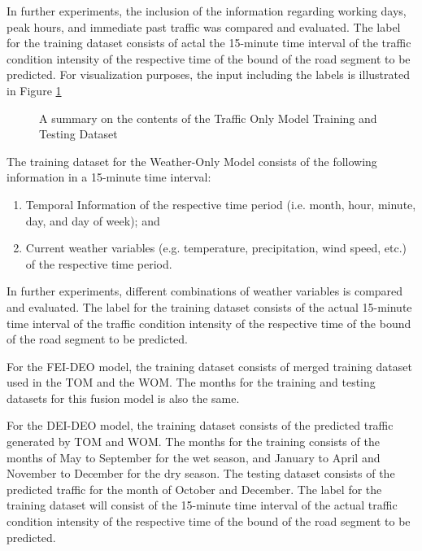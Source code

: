 In further experiments, the inclusion of the information regarding working days, peak hours, and immediate past traffic was compared and evaluated. The label for the training dataset consists of actal the 15-minute time interval of the traffic condition intensity of the respective time of the bound of the road segment to be predicted. For visualization purposes, the input including the labels is illustrated in Figure \ref{fig:TOM_TrainingTestingInput}


\begin{figure}
\centering
\captionsetup{justification=centering}
\caption{A summary on the contents of the Traffic Only Model Training and Testing Dataset}
\label{fig:TOM_TrainingTestingInput}
\end{figure}


The training dataset for the Weather-Only Model consists of the following information in a 15-minute time interval:

\begin{enumerate}
\item Temporal Information of the respective time period (i.e. month, hour, minute, day, and day of week); and
\item Current weather variables (e.g. temperature, precipitation, wind speed, etc.) of the respective time period.
\end{enumerate}

In further experiments, different combinations of weather variables is compared and evaluated. The label for the training dataset consists of the actual 15-minute time interval of the traffic condition intensity of the respective time of the bound of the road segment to be predicted.

For the FEI-DEO model, the training dataset consists of merged training dataset used in the TOM and the WOM. The months for the training and testing datasets for this fusion model is also the same.

For the DEI-DEO model, the training dataset consists of the predicted traffic generated by TOM and WOM. The months for the training consists of the months of May to September for the wet season, and January to April and November to December for the dry season. The testing dataset consists of the predicted traffic for the month of October and December. The label for the training dataset will consist of the 15-minute time interval of the actual traffic condition intensity of the respective time of the bound of the road segment to be predicted.


